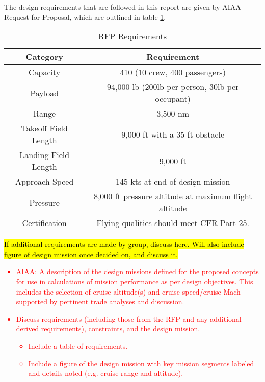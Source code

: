 The design requirements that are followed in this report are given by AIAA Request for Proposal, which are outlined in table \ref{tab:req}. 

\begin{table}[h!] 
    \centering
    \caption{RFP Requirements}
    \begin{tabular}{ |c||c| }\toprule
    \textbf{Category} & \textbf{Requirement} \\\hline\hline
    Capacity & 410 (10 crew, 400 passengers) \\\hline
    Payload & 94,000 lb (200lb per person, 30lb per occupant) \\\hline
    Range & 3,500 nm \\\hline
    Takeoff Field Length & 9,000 ft with a 35 ft obstacle \\\hline
    Landing Field Length & 9,000 ft \\\hline
    Approach Speed & 145 kts at end of design mission\\\hline
    Pressure & 8,000 ft pressure altitude at maximum flight altitude \\\hline
    Certification & Flying qualities should meet CFR Part 25.\\\hline 

    \end{tabular}\label{tab:req}
\end{table}

\hl{If additional requirements are made by group, discuss here. Will also include figure of design mission once decided on, and discuss it.}


\textcolor{red}{
\begin{itemize}
    \item AIAA: A description of the design missions defined for the proposed concepts for use in
calculations of mission performance as per design objectives. This includes the
selection of cruise altitude(s) and cruise speed/cruise Mach supported by pertinent
trade analyses and discussion.
    \item Discuss requirements (including those from the RFP and any additional derived requirements), constraints, and the design mission.
    \begin{itemize}
        \item Include a table of requirements.
        \item Include a figure of the design mission with key mission segments labeled and details noted (e.g. cruise range and altitude).
    \end{itemize}
\end{itemize}}
